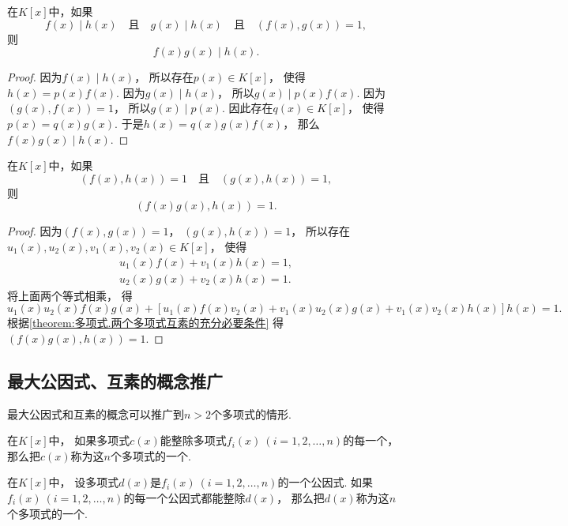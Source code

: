 \begin{property}\label{theorem:多项式.互素.性质2}
在\(K[x]\)中，如果\[
	f(x) \mid h(x)
	\quad\text{且}\quad
	g(x) \mid h(x)
	\quad\text{且}\quad
	(f(x),g(x))=1,
\]
则\[
	f(x) g(x) \mid h(x).
\]
\begin{proof}
因为\(f(x) \mid h(x)\)，
所以存在\(p(x) \in K[x]\)，
使得\(h(x) = p(x) f(x)\).
因为\(g(x) \mid h(x)\)，
所以\(g(x) \mid p(x) f(x)\).
因为\((g(x),f(x))=1\)，
所以\(g(x) \mid p(x)\).
因此存在\(q(x) \in K[x]\)，
使得\(p(x) = q(x) g(x)\).
于是\(h(x) = q(x) g(x) f(x)\)，
那么\(f(x) g(x) \mid h(x)\).
\end{proof}
\end{property}

\begin{property}\label{theorem:多项式.互素.性质3}
在\(K[x]\)中，如果\[
	(f(x),h(x))=1
	\quad\text{且}\quad
	(g(x),h(x))=1,
\]
则\[
	(f(x) g(x),h(x))=1.
\]
\begin{proof}
因为\((f(x),g(x))=1\)，
\((g(x),h(x))=1\)，
所以存在\(u_1(x),u_2(x),v_1(x),v_2(x) \in K[x]\)，
使得\begin{gather*}
	u_1(x) f(x) + v_1(x) h(x) = 1, \\
	u_2(x) g(x) + v_2(x) h(x) = 1.
\end{gather*}
将上面两个等式相乘，
得\[
	u_1(x) u_2(x) f(x) g(x)
	+ [
		u_1(x) f(x) v_2(x)
		+ v_1(x) u_2(x) g(x)
		+ v_1(x) v_2(x) h(x)
	] h(x)
	= 1.
\]
根据\cref{theorem:多项式.两个多项式互素的充分必要条件}
得\((f(x) g(x),h(x))=1\).
\end{proof}
\end{property}

\subsection{最大公因式、互素的概念推广}
最大公因式和互素的概念可以推广到\(n>2\)个多项式的情形.
\begin{definition}
在\(K[x]\)中，
如果多项式\(c(x)\)能整除多项式\(f_i(x)\ (i=1,2,\dotsc,n)\)的每一个，
那么把\(c(x)\)称为这\(n\)个多项式的一个.
\end{definition}

\begin{definition}
在\(K[x]\)中，
设多项式\(d(x)\)是\(f_i(x)\ (i=1,2,\dotsc,n)\)的一个公因式.
如果\(f_i(x)\ (i=1,2,\dotsc,n)\)的每一个公因式都能整除\(d(x)\)，
那么把\(d(x)\)称为这\(n\)个多项式的一个.
\end{definition}

